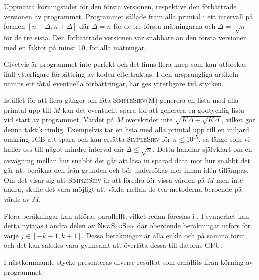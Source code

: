 \begin{table}[H]
\centering

\caption{
Uppmätta körningstider för den första versionen, respektive den förbättrade versionen av programmet.
Programmet sållade fram alla primtal i ett intervall på formen $[n-\Delta,n+\Delta]$ där $\Delta=n$ för de tre första mätningarna och $\Delta=\sqrt[3]{n}$ för de tre sista.
Den förbättrade versionen var snabbare än den första versionen med en faktor på minst 10, för alla mätningar.}
\label{implementering.tidtabell}
\end{table}


Givetvis är programmet inte perfekt och det finns flera knep som kan utforskas ifall ytterligare förbättring av koden eftertraktas.
I den ursprungliga artikeln \cite{HaraldSieve} nämns ett fåtal eventuella förbättringar, här ges ytterligare två stycken.
\begin{myitemize}
    \item
    Istället för att flera gånger om låta \textsc{SimpleSiev(M)} generera en lista med alla primtal upp till $M$ kan det eventuellt spara tid att generera en godtycklig lista vid start av programmet.
    Värdet på $M$ överskrider inte $\sqrt{K\Delta+\sqrt{K\Delta}}$, vilket gör denna taktik rimlig.
    Exempelvis tar en lista med alla primtal upp till en miljard omkring 1GB att spara och kan ersätta \textsc{SimpleSiev} för $n\leq 10^{35}$, så länge som vi håller oss till något mindre interval där $\Delta\leq\sqrt{n}$.
    Detta handlar självklart om en avvägning mellan hur snabbt det går att läsa in sparad data mot hur snabbt det går att beräkna den från grunden och bör undersökas mer innan idén tillämpas. 
    Om det visar sig att \textsc{SimpleSiev} är att föredra för vissa värden på $M$ men inte andra, 
    skulle det vara möjligt att växla mellan de två metoderna beroende på värde av $M$.
    \item
    Flera beräkningar kan utföras parallellt, vilket redan föreslås i \cite{HaraldSieve}. 
    I synnerhet kan detta nyttjas i andra delen av \textsc{NewSegSiev} där oberoende beräkningar utförs för varje $j\in[-k-1,k+1]$.
    Dessa beräkningar är alla enkla och på samma form, och det kan således vara gynnsamt att överlåta dessa till datorns GPU.
\end{myitemize}

I nästkommande stycke presenteras diverse resultat som erhållits ifrån körning av programmet.

